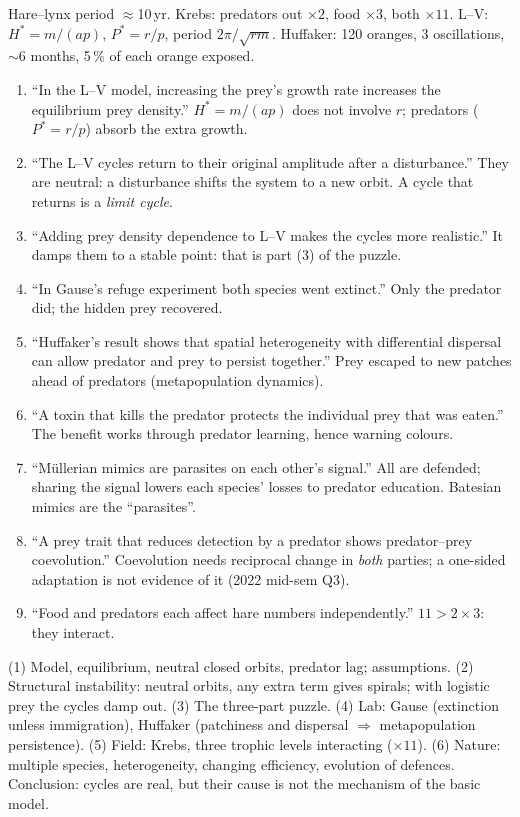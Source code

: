 \begin{numbers}
Hare--lynx period $\approx$10\,yr. Krebs: predators out $\times2$, food $\times3$, both $\times11$. L--V: $H^*=m/(ap)$,
$P^*=r/p$, period $2\pi/\sqrt{rm}$. Huffaker: 120 oranges, 3 oscillations, $\sim$6 months, 5\,\% of each orange exposed.
\end{numbers}

\begin{statements}
\begin{enumerate}[label=\arabic*.]
\item ``In the L--V model, increasing the prey's growth rate increases the equilibrium prey density.''
\F $H^*=m/(ap)$ does not involve $r$; predators ($P^*=r/p$) absorb the extra growth.
\item ``The L--V cycles return to their original amplitude after a disturbance.''
\F They are neutral: a disturbance shifts the system to a new orbit. A cycle that returns is a \emph{limit cycle}.
\item ``Adding prey density dependence to L--V makes the cycles more realistic.''
\F It damps them to a stable point: that is part (3) of the puzzle.
\item ``In Gause's refuge experiment both species went extinct.''
\F Only the predator did; the hidden prey recovered.
\item ``Huffaker's result shows that spatial heterogeneity with differential dispersal can allow predator and prey to persist together.''
\T Prey escaped to new patches ahead of predators (metapopulation dynamics).
\item ``A toxin that kills the predator protects the individual prey that was eaten.''
\F The benefit works through predator learning, hence warning colours.
\item ``Müllerian mimics are parasites on each other's signal.''
\F All are defended; sharing the signal lowers each species' losses to predator education. Batesian mimics are the ``parasites''.
\item ``A prey trait that reduces detection by a predator shows predator--prey coevolution.''
\F Coevolution needs reciprocal change in \emph{both} parties; a one-sided adaptation is not evidence of it (2022 mid-sem Q3).
\item ``Food and predators each affect hare numbers independently.''
\F $11>2\times3$: they interact.
\end{enumerate}
\end{statements}

\begin{longans}
(1) Model, equilibrium, neutral closed orbits, predator lag; assumptions. (2) Structural instability: neutral orbits,
any extra term gives spirals; with logistic prey the cycles damp out. (3) The three-part puzzle. (4) Lab: Gause
(extinction unless immigration), Huffaker (patchiness and dispersal $\Rightarrow$ metapopulation persistence).
(5) Field: Krebs, three trophic levels interacting ($\times11$). (6) Nature: multiple species, heterogeneity, changing
efficiency, evolution of defences. Conclusion: cycles are real, but their cause is not the mechanism of the basic model.
\end{longans}
